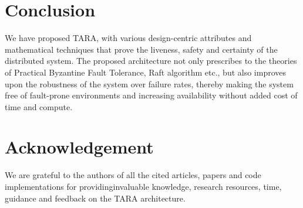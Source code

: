 \documentclass[]{article}
\begin{document}
\section{Conclusion}
We have proposed TARA, with various design-centric attributes and mathematical techniques that prove the liveness, safety and certainty of the distributed system. The proposed architecture not only prescribes to the theories of Practical Byzantine Fault Tolerance, Raft algorithm etc., but also improves upon the robustness of the system over failure rates, thereby making the system free of fault-prone environments and increasing availability without added cost of time and compute.

\section{Acknowledgement}
We are grateful to the authors of all the cited articles, papers and code implementations for providinginvaluable knowledge, research resources, time, guidance and feedback on the TARA architecture.

 

\end{document}
